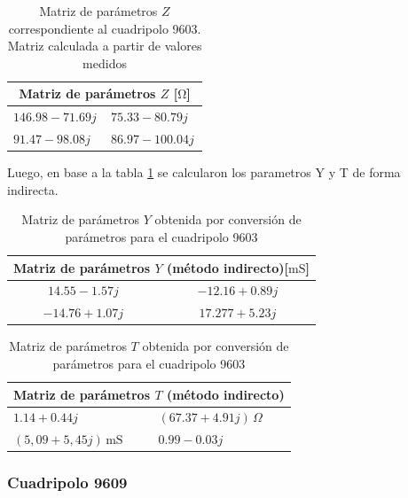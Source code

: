 \begin{table}[H]
\centering
\begin{tabular}{|l|l|}
\hline
\multicolumn{2}{|c|}{\textbf{Matriz de parámetros $Z$ [$\mathrm{\Omega}$]}} \\ \hline
$146.98 - 71.69j\,$ & $75.33 - 80.79j\,$ \\ \hline
$91.47 - 98.08j\,$ & $86.97 - 100.04j\,$ \\ \hline
\end{tabular}
\caption{Matriz de parámetros $Z$ correspondiente al cuadripolo 9603. Matriz calculada a partir de valores medidos}
\label{tab:matriz_Z9603}
\end{table}

Luego, en base a la tabla \ref{tab:matriz_Z9603} se calcularon los parametros Y y T de forma indirecta.

\begin{table}[H]
\centering
\begin{tabular}{|c|c|}
\hline
\multicolumn{2}{|c|}{\textbf{Matriz de parámetros $Y$ (método indirecto)[$\mathrm{mS}$]}} \\ \hline
$14.55 - 1.57j\,$ & $-12.16 + 0.89j\,$ \\ \hline
$-14.76 + 1.07j\,$ & $17.277 + 5.23j\,$ \\ \hline
\end{tabular}
\caption{Matriz de parámetros $Y$ obtenida por conversión de parámetros para el cuadripolo 9603}
\label{tab:matriz_Y9603_indirecta}
\end{table}

\begin{table}[H]
\centering
\begin{tabular}{|l|l|}
\hline
\multicolumn{2}{|c|}{\textbf{Matriz de parámetros $T$ (método indirecto)}} \\ \hline
$1.14 + 0.44j$ & $(67.37 + 4.91j)\,\Omega$ \\ \hline
$(5,09 + 5,45j)\,\mathrm{mS}$ & $0.99 - 0.03j$ \\ \hline
\end{tabular}
\caption{Matriz de parámetros $T$ obtenida por conversión de parámetros para el cuadripolo 9603}
\label{tab:matriz_T9603_indirecta}
\end{table}
	
	\subsubsection*{Cuadripolo 9609}
	

